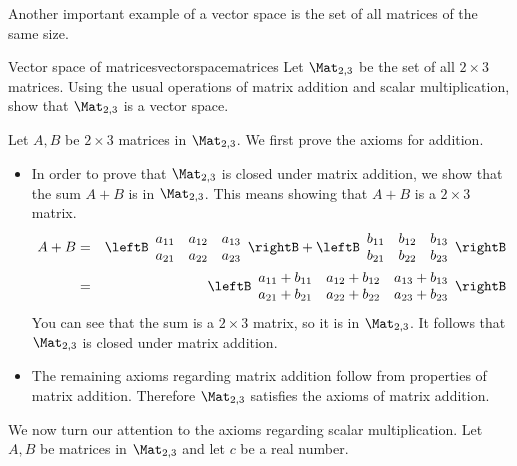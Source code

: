 Another important example of a vector space is the set of all matrices of the same size. 

\begin{example}{Vector space of matrices}{vectorspacematrices}
Let $\Mat_{2,3}$ be the set of all $2 \times 3$ matrices. Using the usual operations of matrix addition and scalar multiplication, show that $\Mat_{2,3}$ is a vector space. 
\end{example}

\begin{solution}
Let $A, B$ be $2 \times 3$ matrices in $\Mat_{2,3}$. We first prove the axioms for addition.

\begin{itemize}
\item
In order to prove that $\Mat_{2,3}$ is closed under matrix addition, we show that the sum $A+B$ is in $\Mat_{2,3}$. This means showing that $A+B$ is a $2 \times 3$ matrix. 
\begin{eqnarray*}
A+B &=& \leftB \begin{array}{rrr}
a_{11} & a_{12} & a_{13}\\
a_{21} & a_{22} & a_{23}
\end{array} \rightB + \leftB \begin{array}{rrr}
b_{11} & b_{12} & b_{13}\\
b_{21} & b_{22} & b_{23}
\end{array} \rightB \\
&=& \leftB \begin{array}{rrr}
a_{11} + b_{11} & a_{12}+b_{12} & a_{13}+b_{13}\\
a_{21} +b_{21}& a_{22}+b_{22} & a_{23}+b_{23}
\end{array} \rightB
\end{eqnarray*}
You can see that the sum is a $2\times 3$ matrix, so it is in $\Mat_{2,3}$. It follows that $\Mat_{2,3}$ is closed under matrix addition. 

\item 
The remaining axioms regarding matrix addition follow from properties of matrix addition. Therefore $\Mat_{2,3}$ satisfies the axioms of matrix addition.
\end{itemize}

We now turn our attention to the axioms regarding scalar multiplication. Let $A, B$ be matrices in $\Mat_{2,3}$ and let $c$ be a real number.


\end{solution}

